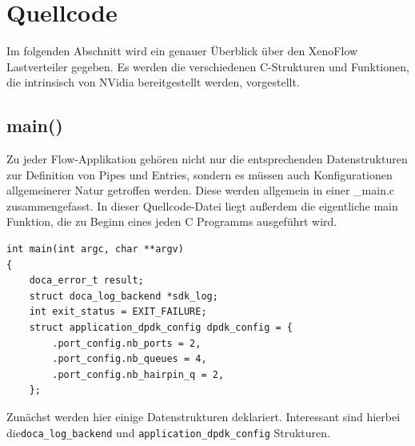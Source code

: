 \section{Quellcode}
Im folgenden Abschnitt wird ein genauer Überblick über den XenoFlow Lastverteiler gegeben. Es werden die verschiedenen C-Strukturen und Funktionen, die intrinsisch von NVidia bereitgestellt werden, vorgestellt. 
\subsection{main()}
Zu jeder Flow-Applikation gehören nicht nur die entsprechenden Datenstrukturen zur Definition von Pipes und Entries, sondern es müssen auch Konfigurationen allgemeinerer Natur getroffen werden. Diese werden allgemein in einer \_main.c zusammengefasst. In dieser Quellcode-Datei liegt außerdem die eigentliche main Funktion, die zu Beginn eines jeden C Programms ausgeführt wird.
\begin{verbatim}
int main(int argc, char **argv)
{
	doca_error_t result;
	struct doca_log_backend *sdk_log;
	int exit_status = EXIT_FAILURE;
	struct application_dpdk_config dpdk_config = {
		.port_config.nb_ports = 2,
		.port_config.nb_queues = 4,
		.port_config.nb_hairpin_q = 2,
	};
\end{verbatim}
Zunächst werden hier einige Datenstrukturen deklariert. Interessant sind hierbei die\newline\texttt{doca\_log\_backend} und \texttt{application\_dpdk\_config} Strukturen.

